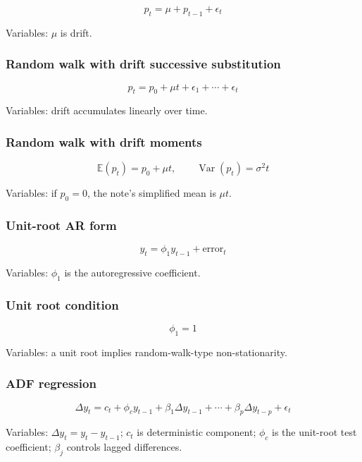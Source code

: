 \documentclass[
  8pt,
  twocolumn]{extarticle}
\begin{document}
\[
p_t=\mu+p_{t-1}+\epsilon_t
\]

Variables: \(\mu\) is drift.

\subsubsection{Random walk with drift successive
substitution}\label{random-walk-with-drift-successive-substitution}

\[
p_t=p_0+\mu t+\epsilon_1+\cdots+\epsilon_t
\]

Variables: drift accumulates linearly over time.

\subsubsection{Random walk with drift
moments}\label{random-walk-with-drift-moments}

\[
\mathbb E(p_t)=p_0+\mu t,\qquad \operatorname{Var}(p_t)=\sigma^2t
\]

Variables: if \(p_0=0\), the note's simplified mean is \(\mu t\).

\subsubsection{Unit-root AR form}\label{unit-root-ar-form}

\[
y_t=\phi_1y_{t-1}+\text{error}_t
\]

Variables: \(\phi_1\) is the autoregressive coefficient.

\subsubsection{Unit root condition}\label{unit-root-condition}

\[
\phi_1=1
\]

Variables: a unit root implies random-walk-type non-stationarity.

\subsubsection{ADF regression}\label{adf-regression}

\[
\Delta y_t=c_t+\phi_cy_{t-1}+\beta_1\Delta y_{t-1}+\cdots+\beta_p\Delta y_{t-p}+\epsilon_t
\]

Variables: \(\Delta y_t=y_t-y_{t-1}\); \(c_t\) is deterministic
component; \(\phi_c\) is the unit-root test coefficient; \(\beta_j\)
controls lagged differences.
\end{document}
